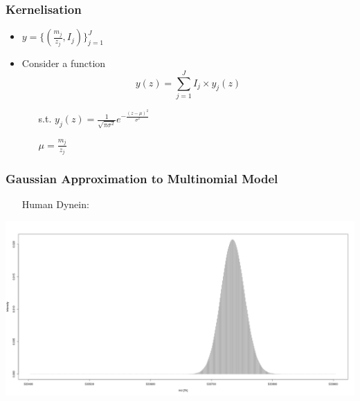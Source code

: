 \documentclass[xetex]{beamer}
\begin{document}
	\begin{frame}\frametitle{Kernelisation}

		\begin{itemize}
			\item $y = \Big\{ (\frac{m_j}{z_j}, I_j) \Big\}_{j = 1}^{J}$
			\item Consider a function
				$$ y(z) = \sum_{j=1}^J I_j \times y_j (z)$$
			\begin{itemize}
			 	\item[s.t.]$y_j (z) = \frac{1}{\sqrt{\pi \sigma^2}} e^{-\frac{(z-\mu)^2}{\sigma^2}}$ 
			 	\item[]$\mu = \frac{m_j}{z_j}$
			\end{itemize} 
		\end{itemize}
	\end{frame}


	\begin{frame}\frametitle{Gaussian Approximation to Multinomial Model}

		\begin{itemize}
			\item[] Human Dynein: 			
		\end{itemize}

		\begin{center}
			\includegraphics[width=.8\textwidth, keepaspectratio]{./picts/humanDynein.png}
		\end{center}
	\end{frame}
\end{document}
